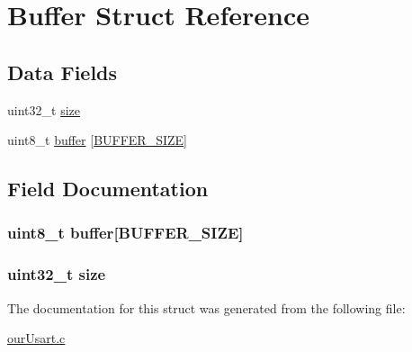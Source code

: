 \hypertarget{struct_buffer}{}\section{Buffer Struct Reference}
\label{struct_buffer}
\subsection*{Data Fields}
\begin{DoxyCompactItemize}
\item 
uint32\+\_\+t \hyperlink{struct_buffer_ab2c6b258f02add8fdf4cfc7c371dd772}{size}
\item 
uint8\+\_\+t \hyperlink{struct_buffer_a97eaba5b61706891a4da114bde40da4d}{buffer} \mbox{[}\hyperlink{our_usart_8c_a6b20d41d6252e9871430c242cb1a56e7}{B\+U\+F\+F\+E\+R\+\_\+\+S\+I\+ZE}\mbox{]}
\end{DoxyCompactItemize}


\subsection{Field Documentation}
\subsubsection[{\texorpdfstring{buffer}{buffer}}]{\setlength{\rightskip}{0pt plus 5cm}uint8\+\_\+t buffer\mbox{[}{\bf B\+U\+F\+F\+E\+R\+\_\+\+S\+I\+ZE}\mbox{]}}\hypertarget{struct_buffer_a97eaba5b61706891a4da114bde40da4d}{}\label{struct_buffer_a97eaba5b61706891a4da114bde40da4d}
\subsubsection[{\texorpdfstring{size}{size}}]{\setlength{\rightskip}{0pt plus 5cm}uint32\+\_\+t size}\hypertarget{struct_buffer_ab2c6b258f02add8fdf4cfc7c371dd772}{}\label{struct_buffer_ab2c6b258f02add8fdf4cfc7c371dd772}


The documentation for this struct was generated from the following file\+:\begin{DoxyCompactItemize}
\item 
\hyperlink{our_usart_8c}{our\+Usart.\+c}\end{DoxyCompactItemize}
